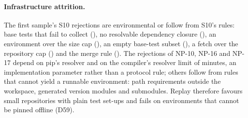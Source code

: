 \paragraph{Infrastructure attrition.} The first sample's S10 rejections are environmental or follow from S10's rules:
base tests that fail to collect (), no resolvable dependency closure
(), an environment over the size cap (), an empty base-test
subset (), a fetch over the repository cap () and the
merge rule (). The rejections of NP-10, NP-16 and NP-17 depend on pip's resolver and on the
compiler's resolver limit of  minutes, an implementation parameter rather than a
protocol rule; others follow from rules that cannot yield a runnable environment: path requirements outside the
workspace, generated version modules and submodules. Replay therefore favours small repositories with plain test
set-ups and fails on environments that cannot be pinned offline (D59).


